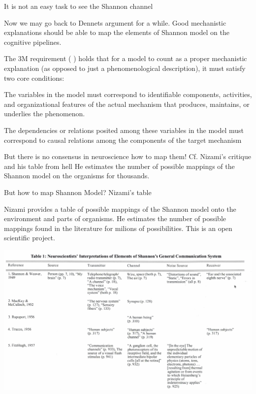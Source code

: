 \documentclass[10pt, aspectratio=169]{beamer}
\begin{document}
    \begin{frame}[label=shannon_channel] {It is not an easy task to see the Shannon channel}
    
        Now we may go back to Dennets argument for a while. Good mechanistic explanations should be able to map the elements of Shannon model on the cognitive pipelines. 
     
     The 3M requirement (\cite{kaplan_explanatory_2011-1} ) holds that for a model to count as a proper mechanistic explanation (as opposed to just a phenomenological description), it must satisfy two core conditions:
     
     The variables in the model must correspond to identifiable components, activities, and organizational features of the actual mechanism that produces, maintains, or underlies the phenomenon.
     
     The dependencies or relations posited among these variables in the model must correspond to causal relations among the components of the target mechanism
     
     But there is no consensus in neuroscience how to map them!   Cf.  Nizami's critique and his table from hell \cite{nizami_information_2019}
     He estimates the number of possible mappings of the Shannon model on the organisms for thousands. 
     
     
     \end{frame}

\begin{frame}[label=nizami_table]  {But how to map Shannon Model? Nizami's table} 
   
  Nizami provides a table of possible mappings of the Shannon model onto the environment and parts of organisms. He estimates the number of possible mappings found in the literature for milions of possibilities. This is an open scientific project.
        \begin{center}
            \includegraphics[width=1\textwidth]{images/Nizami_table1.png}
        \end{center}

\end{frame}
\end{document}
